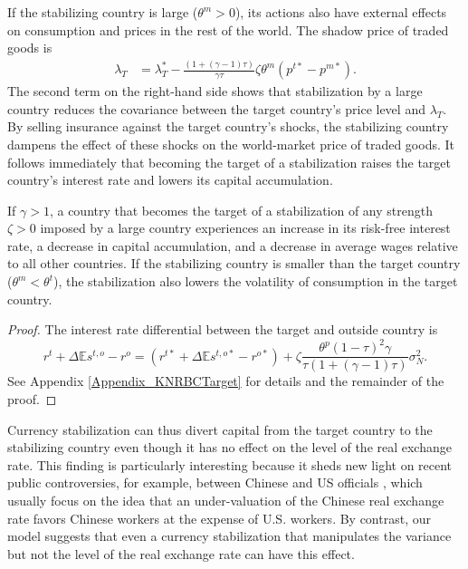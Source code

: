 \documentclass[12pt,letter]{article}
\theoremstyle{break} \theorembodyfont{\normalfont\itshape}
\theoremstyle{break}
\theoremstyle{break} \theorembodyfont{\normalfont\itshape}
\theoremstyle{break} \theorembodyfont{\normalfont\itshape}
\begin{document}
If the stabilizing country is large (\(\theta^m>0\)), its actions also
have external effects on consumption and prices in the rest of the
world. The shadow price of traded goods is
\begin{equation}
  \begin{split}
    \lambda_T & = \lambda_T^* - \frac{(1 + (\gamma - 1) \tau)}{\gamma
      \tau} \zeta\theta^m \left( p^{t \ast} - p^{m \ast} \right).
    \label{eqn:lambdat2}
  \end{split}
\end{equation} 
The second term on the right-hand side shows that stabilization by a
large country reduces the covariance between the target country's
price level and $\lambda_T$. By selling insurance against the target
country's shocks, the stabilizing country dampens the effect of these
shocks on the world-market price of traded goods. It follows
immediately that becoming the target of a stabilization raises the
target country's interest rate and lowers its capital accumulation.
\begin{prop}
  If \(\gamma>1\), a country that becomes the target of a
  stabilization of any strength $\zeta > 0$ imposed by a large country
  experiences an increase in its risk-free interest rate, a decrease
  in capital accumulation, and a decrease in average wages relative to
  all other countries. If the stabilizing country is smaller than the
  target country (\(\theta^m<\theta^t\)), the stabilization also
  lowers the volatility of consumption in the target country.
  \label{prop:KNRBCTarget}
\end{prop}
\begin{proof}
  The interest rate differential between the target and outside
  country is
  \begin{equation*}
    r^t + \Delta\mathbb{E}s^{t, o} - r^o =  
    \left(r^{t \ast} + \Delta\mathbb{E}s^{t, o \ast} - r^{o \ast} \right) + 
    \zeta \frac{\theta^p (1 - \tau)^2 \gamma}{\tau \left( 1 + (\gamma - 1) \tau \right)} \sigma_N^2.
  \end{equation*}
  See Appendix \ref{Appendix_KNRBCTarget} for details and the
  remainder of the proof.
\end{proof}

Currency stabilization can thus divert capital from the target country
to the stabilizing country even though it has no effect on the level
of the real exchange rate. This finding is particularly interesting
because it sheds new light on recent public controversies, for
example, between Chinese and US officials \citep{Levy2011}, which
usually focus on the idea that an under-valuation of the Chinese real
exchange rate favors Chinese workers at the expense of U.S. workers.
By contrast, our model suggests that even a currency stabilization
that manipulates the variance but not the level of the real exchange
rate can have this effect.
\end{document}
